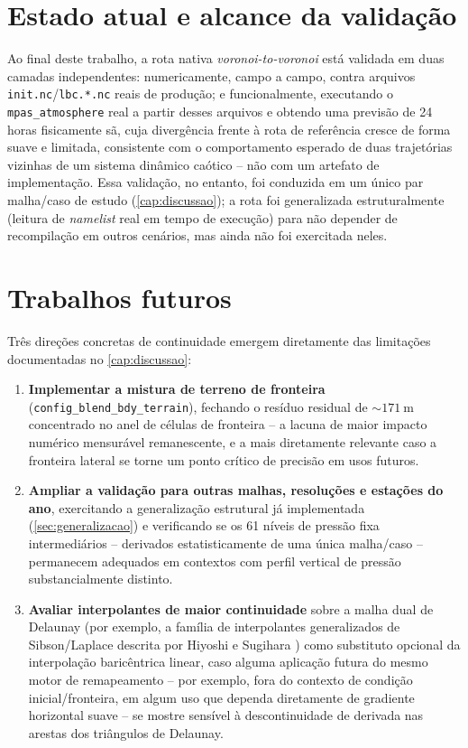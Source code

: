 \section{Estado atual e alcance da validação}

Ao final deste trabalho, a rota nativa \emph{voronoi-to-voronoi} está
validada em duas camadas independentes: numericamente, campo a campo,
contra arquivos \texttt{init.nc}/\texttt{lbc.*.nc} reais de produção; e
funcionalmente, executando o \texttt{mpas\_atmosphere} real a partir
desses arquivos e obtendo uma previsão de 24 horas fisicamente sã, cuja
divergência frente à rota de referência cresce de forma suave e
limitada, consistente com o comportamento esperado de duas trajetórias
vizinhas de um sistema dinâmico caótico -- não com um artefato de
implementação. Essa validação, no entanto, foi conduzida em um único
par malha/caso de estudo (\cref{cap:discussao}); a rota foi generalizada
estruturalmente (leitura de \textit{namelist} real em tempo de execução)
para não depender de recompilação em outros cenários, mas ainda não foi
exercitada neles.

\section{Trabalhos futuros}

Três direções concretas de continuidade emergem diretamente das
limitações documentadas no \cref{cap:discussao}:

\begin{enumerate}
  \item \textbf{Implementar a mistura de terreno de fronteira}
    (\texttt{config\_blend\_bdy\_terrain}), fechando o resíduo residual
    de $\sim\SI{171}{\metre}$ concentrado no anel de células de
    fronteira -- a lacuna de maior impacto numérico mensurável
    remanescente, e a mais diretamente relevante caso a fronteira
    lateral se torne um ponto crítico de precisão em usos futuros.
  \item \textbf{Ampliar a validação para outras malhas, resoluções e
    estações do ano}, exercitando a generalização estrutural já
    implementada (\cref{sec:generalizacao}) e verificando se os 61
    níveis de pressão fixa intermediários -- derivados estatisticamente
    de uma única malha/caso -- permanecem adequados em contextos com
    perfil vertical de pressão substancialmente distinto.
  \item \textbf{Avaliar interpolantes de maior continuidade} sobre a
    malha dual de Delaunay (por exemplo, a família de interpolantes
    generalizados de Sibson/Laplace descrita por Hiyoshi e Sugihara
    \cite{hiyoshi2000continuity}) como substituto opcional da
    interpolação baricêntrica linear, caso alguma aplicação futura do
    mesmo motor de remapeamento -- por exemplo, fora do contexto de
    condição inicial/fronteira, em algum uso que dependa diretamente de
    gradiente horizontal suave -- se mostre sensível à descontinuidade
    de derivada nas arestas dos triângulos de Delaunay.
\end{enumerate}

